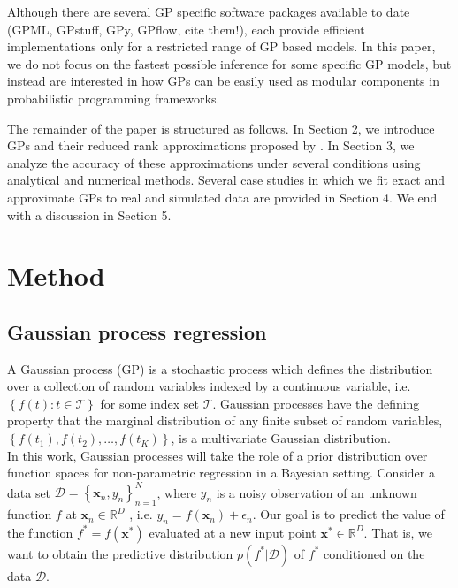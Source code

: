 \documentclass[]{interact}
\theoremstyle{plain}%
\theoremstyle{definition}
\theoremstyle{remark}
\begin{document}
Although there are several GP specific software packages available to date (GPML, GPstuff, GPy, GPflow, cite them!), each provide efficient implementations only for a restricted range of GP based models. In this paper, we do not focus on the fastest possible inference for some specific GP models, but instead are interested in how GPs can be easily used as modular components in probabilistic programming frameworks. 

The remainder of the paper is structured as follows. In Section 2, we introduce GPs and their reduced rank approximations proposed by \cite{solin2018hilbert}. In Section 3, we analyze the accuracy of these approximations under several conditions using analytical and numerical methods. Several case studies in which we fit
exact and approximate GPs to real and simulated data are provided in Section 4. We end with a discussion in Section 5.


\vspace{3mm}
\section{Method}\label{sec:bf_method}

\subsection{Gaussian process regression}

A Gaussian process (GP) is a stochastic process which defines the distribution over a collection of random variables indexed by a continuous variable, i.e. $\left\lbrace f(t): t \in \mathcal{T}\right\rbrace$ for some index set $\mathcal{T}$. Gaussian processes have the defining property that the marginal distribution of any finite subset of random variables, $\left\lbrace f(t_1), f(t_2), \hdots, f(t_K) \right\rbrace$, is a multivariate Gaussian distribution.\\

In this work, Gaussian processes will take the role of a prior distribution over function spaces for non-parametric regression in a Bayesian setting. 
Consider a data set $\mathcal{D} = \left\lbrace \mathbf{x}_n, y_n \right\rbrace_{n=1}^N$, where $y_n$ is a noisy observation of an unknown function $f$ at $\mathbf{x}_n \in \mathbb{R}^D$ , i.e. $y_n = f(\mathbf{x}_n) + \epsilon_n$. Our goal is to predict the value of the function $f^*=f(\mathbf{x}^*)$ evaluated at a new input point $\mathbf{x}^* \in \mathbb{R}^D$. That is, we want to obtain the predictive distribution $p(f^*|\mathcal{D})$ of $f^*$ conditioned on the data $\mathcal{D}$.\\
\end{document}
